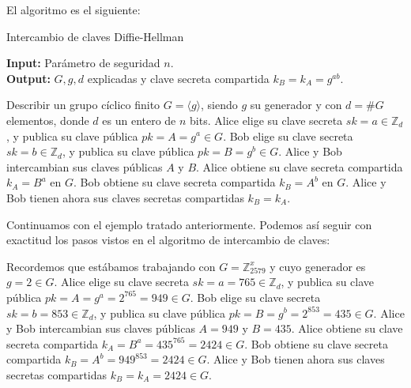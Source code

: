     El algoritmo es el siguiente:
 
    \begin{algorithm}[H]
        \caption{Intercambio de claves Diffie-Hellman}
        \textbf{Input:} Parámetro de seguridad $n$.\\
        \textbf{Output:} $G, g, d$ explicadas y clave secreta compartida $k_{B} = k_{A} = g^{ab}$.
        \bigskip
        \begin{algorithmic}[1]
            \State Describir un grupo cíclico finito $G = \langle g \rangle$, siendo $g$ su generador y con $d = \#G$ elementos, donde $d$ es un entero de $n$ bits.
            \State Alice elige su clave secreta $sk = a \in \mathbb{Z}_{d}$, y publica su clave pública $pk = A = g^{a} \in G$.
            \State Bob elige su clave secreta $sk = b \in \mathbb{Z}_{d}$, y publica su clave pública $pk = B = g^{b} \in G$.
            \State Alice y Bob intercambian sus claves públicas $A$ y $B$.
            \State Alice obtiene su clave secreta compartida $k_{A} = B^{a}$ en $G$.
            \State Bob obtiene su clave secreta compartida $k_{B} = A^{b}$ en $G$.
            \State Alice y Bob tienen ahora sus claves secretas compartidas $k_{B} = k_{A}$.
        \end{algorithmic}
    \end{algorithm}

    \begin{ejemplo} \cite{cryptoSchool}
        Continuamos con el ejemplo tratado anteriormente. Podemos así seguir con exactitud los pasos vistos en el algoritmo de intercambio de claves:
        \begin{algorithmic}[1]
            \State Recordemos que estábamos trabajando con $G = \mathbb{Z}_{2579}^{x}$ y cuyo generador es $g = 2 \in G$.
            \State Alice elige su clave secreta $sk = a = 765 \in \mathbb{Z}_{d}$, y publica su clave pública $pk = A = g^{a} = 2^{765} = 949 \in G$.
            \State Bob elige su clave secreta $sk = b = 853 \in \mathbb{Z}_{d}$, y publica su clave pública $pk = B = g^{b} = 2^{853} = 435 \in G$.
            \State Alice y Bob intercambian sus claves públicas $A = 949$ y $B = 435$.
            \State Alice obtiene su clave secreta compartida $k_{A} = B^{a} = 435^{765} = 2424 \in G$.
            \State Bob obtiene su clave secreta compartida $k_{B} = A^{b} = 949^{853} = 2424 \in G$.
            \State Alice y Bob tienen ahora sus claves secretas compartidas $k_{B} = k_{A} = 2424 \in G$.
        \end{algorithmic}
    \end{ejemplo}

